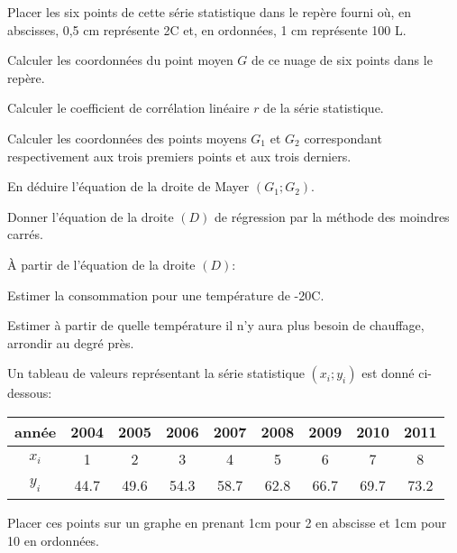 \documentclass[a4paper,12pt]{scrartcl}
\begin{document}
\question{}
Placer les six points de cette série statistique dans le repère fourni où, en abscisses, 0,5 cm représente 2\textdegree{}C et, en ordonnées, 1 cm représente 100 L.

\begin{center}
\end{center}

\question{}
Calculer les coordonnées du point moyen $G$ de ce nuage de six points dans le repère.

\question{}
Calculer le coefficient de corrélation linéaire $r$ de la série statistique. 

\question{}
Calculer les coordonnées des points moyens $G_1$ et $G_2$ correspondant respectivement aux trois premiers points et aux trois derniers. %

En déduire l'équation de la droite de Mayer $(G_1;G_2)$. 

\question{}
Donner l'équation de la droite $(D)$ de régression par la méthode des moindres carrés. 

\question{}
À partir de l'équation de la droite $(D)$: 

\subquestion{}
Estimer la consommation pour une température de -20\textdegree{}C. 

\subquestion{}
Estimer à partir de quelle température il n'y aura plus besoin de chauffage, arrondir au degré près. \noteprof{20.3\textdegree{}}


Un tableau de valeurs représentant la série statistique $(x_i; y_i)$ est donné ci-dessous:

\begin{center}
    \begin{tabular}{|c|c|c|c|c|c|c|c|c|}
        \hline
        année & 2004 & 2005 & 2006 & 2007& 2008&2009&2010&2011\\ \hline
        $x_i$ & 1    & 2    & 3    & 4  & 5    & 6  & 7  & 8  \\ \hline
        $y_i$ & 44.7 & 49.6 & 54.3 & 58.7 & 62.8 & 66.7 & 69.7 & 73.2 \\ \hline
    \end{tabular}
\end{center}

\question{}\label{q1}
Placer ces points sur un graphe en prenant 1cm pour 2 en abscisse et 1cm pour 10 en ordonnées.
\end{document}
